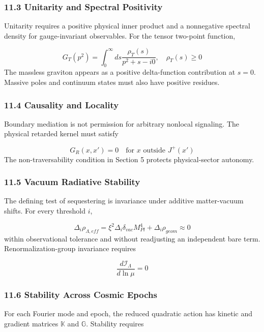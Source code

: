 \documentclass[aps,prd,onecolumn,superscriptaddress,nofootinbib,longbibliography,10pt]{revtex4-2}
\begin{document}
  
\subsubsection*{11.3 Unitarity and Spectral Positivity}

  Unitarity requires a positive physical inner product and a nonnegative spectral density for gauge-invariant observables. For the tensor two-point function,


  \[ G_T(p^2) = \int_0^\infty ds \frac{\rho_T(s)}{p^2 + s - i0}, \quad \rho_T(s) \ge 0 \]
  The massless graviton appears as a positive delta-function contribution at \(s = 0\). Massive poles and continuum states must also have positive residues.



  
\subsubsection*{11.4 Causality and Locality}

  Boundary mediation is not permission for arbitrary nonlocal signaling. The physical retarded kernel must satisfy


  \[ G_R(x,x') = 0 \quad \text{for } x\text{ outside } J^+(x') \]
  The non-traversability condition in Section 5 protects physical-sector autonomy.



  
\subsubsection*{11.5 Vacuum Radiative Stability}

  The defining test of sequestering is invariance under additive matter-vacuum shifts. For every threshold \(i\),


  \[ \Delta_i \rho_{\Lambda,eff} = \xi^2 \Delta_i \delta_{vac} M_{Pl}^4 + \Delta_i \rho_{geom} \approx 0 \]
  within observational tolerance and without readjusting an independent bare term. Renormalization-group invariance requires


  \[ \frac{d\mathcal{I}_\Lambda}{d\ln\mu} = 0 \]

  
\subsubsection*{11.6 Stability Across Cosmic Epochs}

  For each Fourier mode and epoch, the reduced quadratic action has kinetic and gradient matrices \(\mathbb{K}\) and \(\mathbb{G}\). Stability requires
\end{document}
